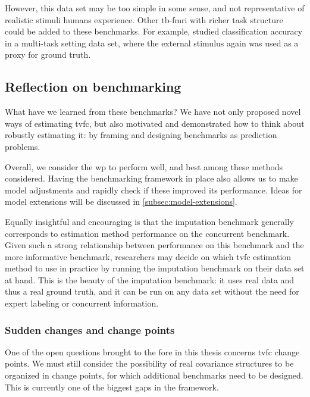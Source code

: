 However, this data set may be too simple in some sense, and not representative of realistic stimuli humans experience.
Other \gls{tb-fmri} with richer task structure could be added to these benchmarks.
For example, \textcite{Xie2019} studied classification accuracy in a multi-task setting data set, where the external stimulus again was used as a proxy for ground truth.

\subsection{Reflection on benchmarking}\label{subsec:benchmarking-reflection}

What have we learned from these benchmarks?
%
We have not only proposed novel ways of estimating \gls{tvfc}, but also motivated and demonstrated how to think about robustly estimating it: by framing and designing benchmarks as prediction problems.

Overall, we consider the \gls{wp} to perform well, and best among these methods considered.
%
Having the benchmarking framework in place also allows us to make model adjustments and rapidly check if these improved its performance.
Ideas for model extensions will be discussed in \cref{subsec:model-extensions}.

Equally insightful and encouraging is that the imputation benchmark generally corresponds to estimation method performance on the concurrent benchmark.
Given such a strong relationship between performance on this benchmark and the more informative benchmark, researchers may decide on which \gls{tvfc} estimation method to use in practice by running the imputation benchmark on their data set at hand.
This is the beauty of the imputation benchmark: it uses real data and thus a real ground truth, and it can be run on any data set without the need for expert labeling or concurrent information.

\subsubsection{Sudden changes and change points}\label{subsec:sudden-changes}

One of the open questions brought to the fore in this thesis concerns \gls{tvfc} change points.
We must still consider the possibility of real covariance structures to be organized in change points, for which additional benchmarks need to be designed.
This is currently one of the biggest gaps in the framework.

